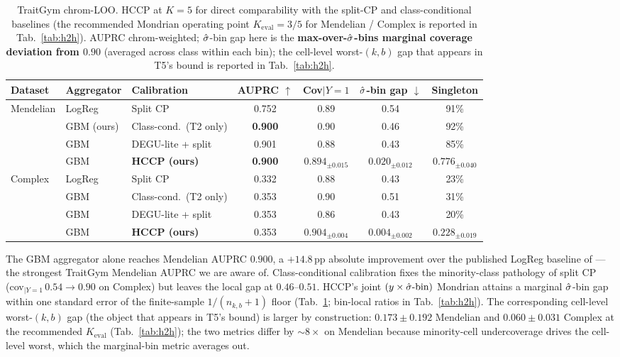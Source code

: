\begin{table}[!htbp]
\centering
\footnotesize
\caption{TraitGym chrom-LOO. HCCP at $K = 5$ for direct comparability with the split-CP and class-conditional baselines (the recommended Mondrian operating point $K_{\mathrm{eval}} = 3 / 5$ for Mendelian / Complex is reported in Tab.~\ref{tab:h2h}). AUPRC chrom-weighted; $\hat{\sigma}$-bin gap here is the \textbf{max-over-$\hat{\sigma}$-bins marginal coverage deviation from $0.90$} (averaged across class within each bin); the cell-level worst-$(k,b)$ gap that appears in T5's bound is reported in Tab.~\ref{tab:h2h}.}
\label{tab:main}
\setlength{\tabcolsep}{2pt}
\begin{tabular}{lllcccc}
\toprule
Dataset & Aggregator & Calibration & AUPRC $\uparrow$ & Cov$|Y{=}1$ & $\hat{\sigma}$-bin gap $\downarrow$ & Singleton \\
\midrule
\multirow{4}{*}{Mendelian}
 & LogReg \citep{benegas2025traitgym} & Split CP & 0.752 & 0.89 & 0.54 & 91\% \\
 & GBM (ours) & Class-cond.\ (T2 only) & \textbf{0.900} & 0.90 & 0.46 & 92\% \\
 & GBM & DEGU-lite + split & 0.901 & 0.88 & 0.43 & 85\% \\
 & GBM & \textbf{HCCP (ours)} & \textbf{0.900} & $0.894_{\pm 0.015}$ & $\mathbf{0.020}_{\pm 0.012}$ & $0.776_{\pm 0.040}$ \\
\midrule
\multirow{4}{*}{Complex}
 & LogReg & Split CP & 0.332 & 0.88 & 0.43 & 23\% \\
 & GBM & Class-cond.\ (T2 only) & 0.353 & 0.90 & 0.51 & 31\% \\
 & GBM & DEGU-lite + split & 0.353 & 0.86 & 0.43 & 20\% \\
 & GBM & \textbf{HCCP (ours)} & 0.353 & $0.904_{\pm 0.004}$ & $\mathbf{0.004}_{\pm 0.002}$ & $0.228_{\pm 0.019}$ \\
\bottomrule
\end{tabular}
\end{table}

The GBM aggregator alone reaches Mendelian AUPRC $0.900$, a $+14.8$\,pp absolute improvement over the published LogReg baseline of \citet{benegas2025traitgym} --- the strongest TraitGym Mendelian AUPRC we are aware of. Class-conditional calibration fixes the minority-class pathology of split CP (cov$_{|Y=1}\,0.54 \to 0.90$ on Complex) but leaves the local gap at $0.46$--$0.51$. HCCP's joint $(y \times \hat{\sigma}\text{-bin})$ Mondrian attains a marginal $\hat{\sigma}$-bin gap within one standard error of the finite-sample $1/(n_{k,b}+1)$ floor (Tab.~\ref{tab:main}; bin-local ratios in Tab.~\ref{tab:h2h}).
The corresponding cell-level worst-$(k,b)$ gap (the object that appears in T5's bound) is larger by construction: $0.173 \pm 0.192$ Mendelian and $0.060 \pm 0.031$ Complex at the recommended $K_{\mathrm{eval}}$ (Tab.~\ref{tab:h2h}); the two metrics differ by $\sim 8\times$ on Mendelian because minority-cell undercoverage drives the cell-level worst, which the marginal-bin metric averages out.

